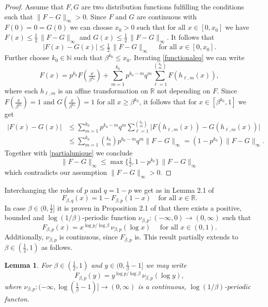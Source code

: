 \documentclass[12pt]{amsart}
\newtheorem{lemma}[theorem]{Lemma}
\theoremstyle{definition}
\theoremstyle{remark}
\newcommand{\rr}{{\mathbb R}}
\newcommand{\nat}{{\mathbb N}}
\numberwithin{equation}{section}
\begin{document}
\begin{proof}
Assume that $F,G$ are two distribution functions fulfilling the conditions such that $\|F-G\|_\infty>0$. Since $F$ and $G$ are continuous with $F(0)=0=G(0)$ we can choose $x_0>0$ such that for all $x\in[0,x_0]$ we have $F(x)\leq\frac12\,\|F-G\|_\infty$ and $G(x)\leq\frac12\,\|F-G\|_\infty$. It follows that
\begin{equation}\label{partialunique}
|F(x)-G(x)|\leq\tfrac12\,\|F-G\|_\infty\quad\text{ for all }x\in[0,x_0].
\end{equation}
Further choose $k_0\in\nat$ such that $\beta^{k_0}\leq x_0$. Iterating \eqref{functionaleq} we can write
$$\displaystyle F(x)=p^{k_0}F(\tfrac{x}{\beta^{k_0}})+\sum_{m=1}^{k_0}p^{k_0-m}q^m\sum_{\ell=1}^{k_0 \choose m} F(h_{\ell,m}(x)),$$
where each $h_{\ell,m}$ is an affine transformation on $\rr$ not depending on $F$. Since $F(\tfrac{x}{\beta^{k_0}})=1$ and $G(\tfrac{x}{\beta^{k_0}})=1$ for all $x\geq\beta^{k_0}$, it follows that for $x\in[\beta^{k_0},1]$ we get
\begin{align*}
|F(x)-G(x)| & \leq\sum_{m=1}^{k_0}p^{k_0-m}q^m\sum_{\ell=1}^{k_0 \choose m} \big|F(h_{\ell,m}(x))-G(h_{\ell,m}(x))\big|\\
& \leq\sum_{m=1}^{k_0}{k_0 \choose m}p^{k_0-m}q^m\|F-G\|_\infty=(1-p^{k_0})\|F-G\|_\infty.
\end{align*}
Together with \eqref{partialunique} we conclude
$$\|F-G\|_\infty\leq\max\{\tfrac12,1-p^{k_0}\}\,\|F-G\|_\infty$$which contradicts our assumption $\|F-G\|_\infty>0$.
\end{proof}

Interchanging the roles of $p$ and $q=1-p$ we get as in Lemma 2.1 of \cite{Sterk}
\begin{equation}\label{dfreverse}
F_{\beta,q}(x) =1-F_{\beta,p}(1-x)\quad\text{for all }x\in\rr.
\end{equation}
In case $\beta\in(0,\frac12]$ it is proven in Proposition 2.1 of \cite{Sterk} that there exists a positive, bounded and $\log(1/\beta)$-periodic function $\nu_{\beta,p}:(-\infty,0)\to(0,\infty)$ such that 
$$F_{\beta,p}(x)=x^{\log p/\log\beta}\,\nu_{\beta,p}(\log x)\quad\text{ for all }x\in(0,1).$$
Additionally, $\nu_{\beta,p}$ is continuous, since $F_{\beta,p}$ is. This result partially extends to $\beta\in(\frac12,1)$ as follows.

\begin{lemma}\label{repstatdistr}
For $\beta\in(\frac12,1)$ and $y\in(0,\frac1{\beta}-1]$ we may write
\begin{equation}\label{repstatleft}
F_{\beta,p}(y)=y^{\log p/\log\beta}\,\nu_{\beta,p}(\log y),
\end{equation}
where $\nu_{\beta,p}:(-\infty,\log(\frac1{\beta}-1)]\to(0,\infty)$ is a continuous, $\log(1/\beta)$-periodic functon.
\end{lemma}
\end{document}
